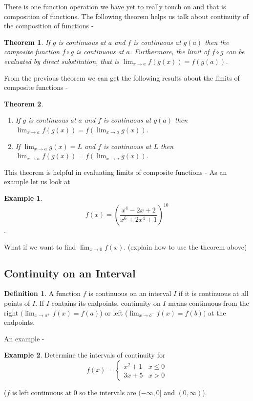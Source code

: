 \documentclass[12pt,reqno]{article}
\newtheorem{Theorem}{Theorem}
\theoremstyle{definition}
\newtheorem*{Definition}{Definition}
\newtheorem*{Example}{Example}
\begin{document}
There is one function operation we have yet to really touch on and that is composition of functions. The following theorem helps us talk about continuity of the composition of functions - 
\begin{Theorem}
	If $g$ is continuous at $a$ and $f$ is continuous at $g(a)$ then the composite function $f \circ g$ is continuous at $a$. Furthermore, the limit of $f \circ g$ can be evaluated by direct substitution, that is $\lim_{x\to a} f(g(x)) = f(g(a))$. 
\end{Theorem}


From the previous theorem we can get the following results about the limits of composite functions - 
\begin{Theorem}
	\begin{enumerate}
		\item[1.] If $g$ is continuous at $a$ and $f$ is continuous at $g(a)$ then $\lim_{x\to a} f(g(x)) = f(\lim_{x\to a} g(x))$. 
		\item[2.] If $\lim_{x\to a} g(x) = L$ and $f$ is continuous at $L$ then $\lim_{x\to a} f(g(x)) = f(\lim_{x\to a} g(x))$. 
	\end{enumerate}
\end{Theorem}

This theorem is helpful in evaluating limits of composite functions - 
As an example let us look at 
\begin{Example}
	$$f(x) = \left(\frac{x^4 - 2x + 2}{x^6 + 2x^4 + 1}\right)^{10}$$. 
	
	What if we want to find $\lim_{x\to 0} f(x)$. (explain how to use the theorem above)
\end{Example}
\subsection{Continuity on an Interval} 
\begin{Definition}
	A function $f$ is continuous on an interval $I$ if it is continuous at all points of $I$. If $I$ contains its endpoints, continuity on $I$ means continuous from the right $(\lim_{x\to a^+} f(x) = f(a)$) or left ($\lim_{x \to b^-} f(x) =f(b))$ at the endpoints. 
\end{Definition}

An example - 
\begin{Example}
	Determine the intervals of continuity for $$f(x) = \begin{cases}
		x^2 + 1 & x \leq 0 \\ 3x + 5 & x > 0
	\end{cases}$$

	($f$ is left continuous at 0 so the intervals are $(-\infty, 0]$ and $(0, \infty)$). 
\end{Example}
\end{document}
